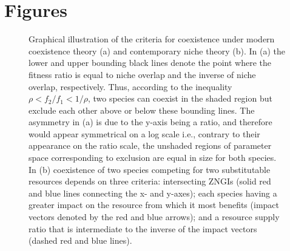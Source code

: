 \clearpage
\section{Figures}
\begin{figure}[h!]
\centering
{}
\caption[Graphical illustration of the criteria for coexistence under modern coexistence theory and contemporary niche theory.]
	{\hspace{1mm}Graphical illustration of the criteria for coexistence under modern coexistence theory (a) and contemporary niche theory (b). In (a) the lower and upper bounding black lines denote the point where the fitness ratio is equal to niche overlap and the inverse of niche overlap, respectively. Thus, according to the inequality $\rho < f_{2}/f_{1} < 1/\rho$, two species can coexist in the shaded region but exclude each other above or below these bounding lines. The asymmetry in (a) is due to the y-axis being a ratio, and therefore would appear symmetrical on a log scale i.e., contrary to their appearance on the ratio scale, the unshaded regions of parameter space corresponding to exclusion are equal in size for both species. In (b) coexistence of two species competing for two substitutable resources depends on three criteria: intersecting ZNGIs (solid red and blue lines connecting the x- and y-axes); each species having a greater impact on the resource from which it most benefits (impact vectors denoted by the red and blue arrows); and a resource supply ratio that is intermediate to the inverse of the impact vectors (dashed red and blue lines).}
\label{fig:conceptfig}
\end{figure}



